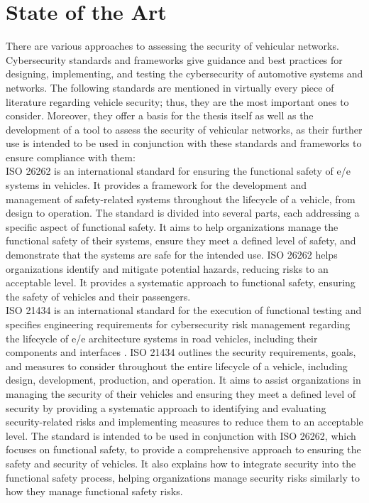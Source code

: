 \chapter{State of the Art}
\label{chp:stateoftheart}

There are various approaches to assessing the security of vehicular networks. 
Cybersecurity standards and frameworks give guidance and best practices for designing, implementing, and testing the cybersecurity of automotive systems and networks. 
The following standards are mentioned in virtually every piece of literature regarding vehicle security; thus, they are the most important ones to consider. 
Moreover, they offer a basis for the thesis itself as well as the development of a tool to assess the security of vehicular networks,
as their further use is intended to be used in conjunction with these standards and frameworks to ensure compliance with them:\\

ISO 26262 is an international standard for ensuring the functional safety of \acrshort{e/e} systems in vehicles. 
It provides a framework for the development and management of safety-related systems throughout the lifecycle of a vehicle, from design to operation.
The standard is divided into several parts, each addressing a specific aspect of functional safety. 
It aims to help organizations manage the functional safety of their systems, ensure they meet a defined level of safety, and demonstrate that the systems are safe for the intended use.
ISO 26262 helps organizations identify and mitigate potential hazards, reducing risks to an acceptable level. 
It provides a systematic approach to functional safety, ensuring the safety of vehicles and their passengers.\\

ISO 21434 is an international standard for the execution of functional testing and specifies engineering requirements for cybersecurity risk 
management regarding the lifecycle of \acrshort{e/e} architecture systems in road vehicles, including their components and interfaces \cite{iso21434}.
ISO 21434 outlines the security requirements, goals, and measures to consider throughout the entire lifecycle of a vehicle, including design, development, production, and operation. 
It aims to assist organizations in managing the security of their vehicles and ensuring they meet a defined level of security by providing a systematic approach to identifying and evaluating security-related risks and implementing measures to reduce them to an acceptable level. 
The standard is intended to be used in conjunction with ISO 26262, which focuses on functional safety, to provide a comprehensive approach to ensuring the safety and security of vehicles. 
It also explains how to integrate security into the functional safety process, helping organizations manage security risks similarly to how they manage functional safety risks.\\

